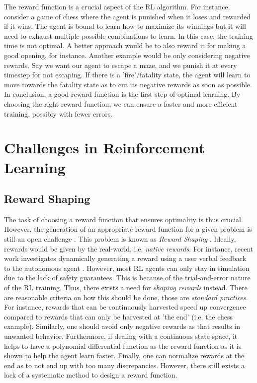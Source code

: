 \documentclass[a4paper,11pt]{article}
\begin{document}
\medskip 

The reward function is a crucial aspect of the RL algorithm. For instance, consider a game of chess 
where the agent is punished when it loses and rewarded if it wins. The agent is bound to learn how to 
maximize its winnings but it will need to exhaust multiple possible combinations to learn. In this case, 
the training time is not optimal. A better approach would be to also reward it for making a good opening, for instance. 
Another example would be only considering negative rewards. Say we want our agent to escape a maze, and we punish it at every timestep for not escaping. 
If there is a 'fire'/fatality state, the agent will learn to move towards the fatality state as to cut its negative rewards as soon as possible. 
In conclusion, a good reward function is the first step of optimal learning. By choosing the right reward function, 
we can ensure a faster and more efficient training, possibly with fewer errors. 

\section{Challenges in Reinforcement Learning}

\subsection{Reward Shaping}
The task of choosing a reward function that ensures optimality is thus crucial. However, the generation of an appropriate 
reward function for a given problem is still an open challenge \cite{kober2013}. This problem is known as \textit{Reward Shaping} \cite{laud2011}.  
Ideally, rewards would be given by the real-world, i.e. \textit{native rewards}. For instance, recent work investigates dynamically generating a reward 
using a user verbal feedback to the autonomous agent \cite{gonzalez2010}. However, most RL agents 
can only stay in simulation due to the lack of safety guarantees. This is because of the trial-and-error nature of the RL training. 
Thus, there exists a need for \textit{shaping rewards} instead. There are reasonable criteria on how this should be done, those are \emph{standard practices}. For instance, 
rewards that can be continuously harvested speed up convergence compared to rewards that can only be harvested at 'the end' (i.e. the chess example). Similarly, one should avoid only 
negative rewards as that results in unwanted behavior. Furthermore, if dealing with a continuous state space, it helps to have a polynomial differential function as the reward function 
as it is shown to help the agent learn faster. Finally, one can normalize rewards at the end as to not end up with too many discrepancies. 
However, there still exists a lack of a systematic method to design a reward function.
\end{document}
